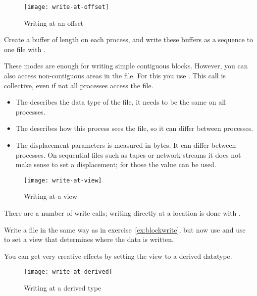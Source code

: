 \begin{figure}[ht]
  \label{fig:write-at}
  \caption{Writing at an offset}
  \texttt{[image: write-at-offset]}
\end{figure}

\begin{exercise}
  \label{ex:blockwrite}
  Create a buffer of length  on each process, and write
  these buffers as a sequence to one file with .
\end{exercise}

These modes are enough for writing simple contiguous blocks. However,
you can also access non-contiguous areas in the file. For this you use
%
.
%
This call is collective, even if not all processes access the file.
\begin{itemize}
\item The  describes the data type of the file, it needs to
  be the same on all processes.
\item The  describes how this process sees the file, so it
  can differ between processes.
\item The  displacement parameters is measured in bytes. It
  can differ between processes. On sequential files such as tapes or
  network streams it does not make sense to set a displacement; for
  those the  value can be
  used.
\end{itemize}

\begin{figure}[ht]
  \label{fig:write-view}
  \caption{Writing at a view}
  \texttt{[image: write-at-view]}
\end{figure}

There are a number of write calls; writing directly at a location is
done with
.

\begin{exercise}
  \label{ex:viewwrite}
  Write a file in the same way as in exercise~\ref{ex:blockwrite},
  but now use  and use  to set
  a view that determines where the data is written.
\end{exercise}

You can get very creative effects by setting the view to a derived
datatype.

\begin{figure}[ht]
  \label{fig:write-derived}
  \caption{Writing at a derived type}
  \texttt{[image: write-at-derived]}
\end{figure}

